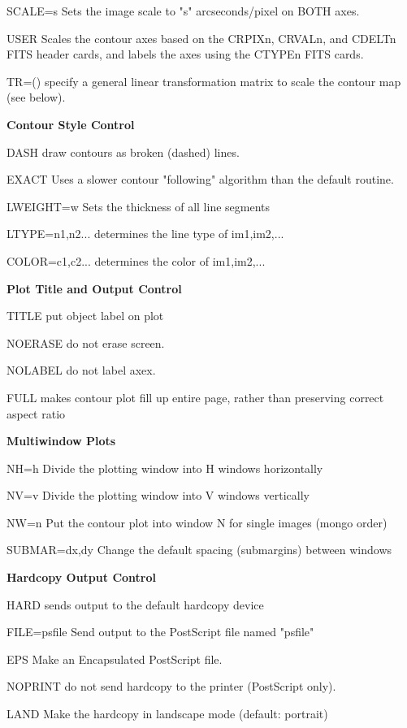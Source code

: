 \begin{command}
  \item[SCALE=s]{Sets the image scale to "s" arcseconds/pixel on BOTH axes.}
  \item[USER]{Scales the contour axes based on the CRPIXn, CRVALn,
       and CDELTn FITS header cards, and labels the axes using
       the CTYPEn FITS cards.}
  \item[TR=()]{specify a general linear transformation matrix to scale
       the contour map (see below).}
  \item[\textbf{Contour Style Control}\hfill]{}
  \item[DASH]{draw contours as broken (dashed) lines.}
  \item[EXACT]{Uses a slower contour "following" algorithm than the
       default routine.}
  \item[LWEIGHT=w]{Sets the thickness of all line segments}
  \item[LTYPE=n1,n2...]{determines the line type of im1,im2,...}
  \item[COLOR=c1,c2...]{determines the color of im1,im2,...}
  \item[\textbf{Plot Title and Output Control}\hfill]{}
  \item[TITLE]{put object label on plot}
  \item[NOERASE]{do not erase screen.}
  \item[NOLABEL ]{do not label axex.}
  \item[FULL ]{makes contour plot fill up entire page, rather
       than preserving correct aspect ratio}
  \item[\textbf{Multiwindow Plots}\hfill]{}
  \item[NH=h]{Divide the plotting window into H windows horizontally}
  \item[NV=v]{Divide the plotting window into V windows vertically}
  \item[NW=n]{Put the contour plot into window N for single images 
       (mongo order)}
  \item[SUBMAR=dx,dy]{Change the default spacing (submargins) between windows}
  \item[\textbf{Hardcopy Output Control}\hfill]{}
  \item[HARD]{sends output to the default hardcopy device}
  \item[FILE=psfile]{Send output to the PostScript file named "psfile"}
  \item[EPS]{Make an Encapsulated PostScript file.}
  \item[NOPRINT]{do not send hardcopy to the printer (PostScript only).}
  \item[LAND]{Make the hardcopy in landscape mode (default: portrait)}
\end{command}
 
